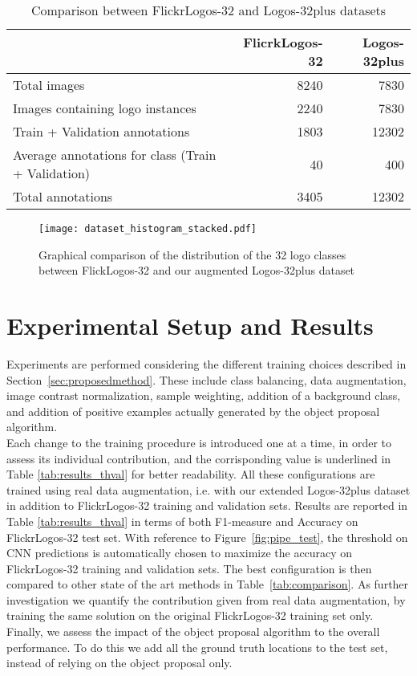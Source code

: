 \documentclass[final,5p,twocolumn]{elsarticle}
\begin{document}
\begin{table*}[htbp]
	\caption{Comparison between FlickrLogos-32 and Logos-32plus datasets}
	\label{tab:datasets_comparison}
	\center
\begin{tabular}{lrr}
\toprule
 & \textbf{FlicrkLogos-32} & \textbf{Logos-32plus} \\ \midrule
Total images & 8240 & 7830\\
Images containing logo instances & 2240 & 7830\\
Train + Validation annotations & 1803 & 12302 \\
Average annotations for class (Train + Validation) & 40 & 400\\
Total annotations & 3405 & 12302 \\ \bottomrule
\end{tabular}
\end{table*}

\begin{figure*}[htbp]
\centering
	\texttt{[image: dataset\_histogram\_stacked.pdf]}
	\caption{Graphical comparison of the distribution of the 32 logo classes between FlickLogos-32 and our augmented Logos-32plus dataset}
	\label{fig:dataset_histogram}
\end{figure*}



\section{Experimental Setup and Results}
\label{sec:results}

Experiments are performed considering the different training choices described in Section~\ref{sec:proposedmethod}. These include class balancing, data augmentation, image contrast normalization, sample weighting, addition of a background class, and addition of positive examples actually generated by the object proposal algorithm.\\
Each change to the training procedure is introduced one at a time, in order to assess its individual contribution, and the corrisponding value is underlined in Table \ref{tab:results_thval} for better readability.
All these configurations are trained using real data augmentation, i.e. with our extended Logos-32plus dataset in addition to FlickrLogos-32 training and validation sets.
Results are reported in Table \ref{tab:results_thval} in terms of both F1-measure and Accuracy on FlickrLogos-32 test set. With reference to Figure~\ref{fig:pipe_test}, the threshold on CNN predictions is automatically chosen to maximize the accuracy on FlickrLogos-32 training and validation sets.
The best configuration is then compared to other state of the art methods in Table~\ref{tab:comparison}.
As further investigation we quantify the contribution given from real data augmentation, by training the same solution on the original FlickrLogos-32 training set only.
Finally, we assess the impact of the object proposal algorithm to the overall performance. To do this we add all the ground truth locations to the test set, instead of relying on the object proposal only. 
\end{document}
